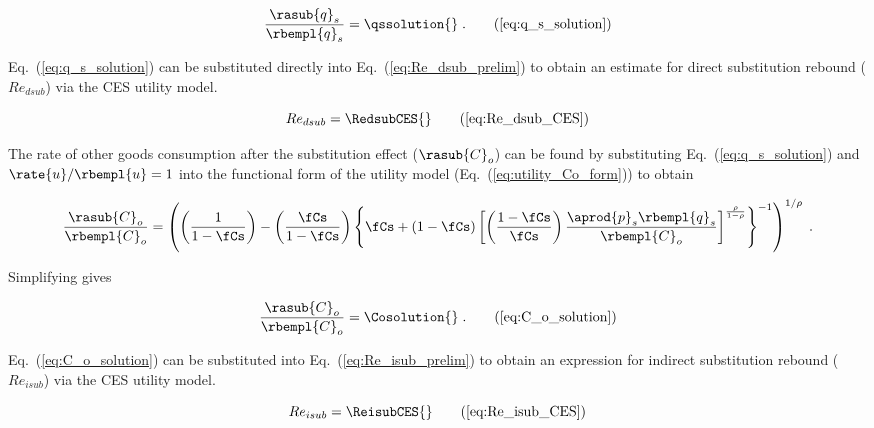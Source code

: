 \begin{equation}
  \frac{\rasub{q}_s}{\rbempl{q}_s} = \qssolution{} \; . \tag{\ref{eq:q_s_solution}}
\end{equation}

Eq.~(\ref{eq:q_s_solution}) can be substituted directly
into Eq.~(\ref{eq:Re_dsub_prelim})
to obtain an estimate for direct substitution rebound ($Re_{dsub}$)
via the CES utility model.

\begin{equation}
  Re_{dsub} = \RedsubCES{} \tag{\ref{eq:Re_dsub_CES}}
\end{equation}

The rate of other goods consumption after the substitution effect ($\rasub{C}_o$) 
can be found by substituting Eq.~(\ref{eq:q_s_solution}) and 
$\rate{u}/\rbempl{u} = 1$ 
into the functional form of the utility model (Eq.~(\ref{eq:utility_Co_form}))
to obtain

\begin{equation}
  \frac{\rasub{C}_o}{\rbempl{C}_o} = \left( \left( \frac{1}{1-\fCs} \right) 
                                     - \left( \frac{\fCs}{1-\fCs} \right)   
              \left\{ \fCs + (1-\fCs)
                  \left[ \left( \frac{1-\fCs}{\fCs} \right) \frac{\aprod{p}_s \rbempl{q}_s}{\rbempl{C}_o}   \right] 
                      ^{\frac{\rho}{1-\rho}} \right\} ^{-1} \right) ^{1/\rho} \; .
\end{equation}

Simplifying gives

\begin{equation}
  \frac{\rasub{C}_o}{\rbempl{C}_o} = \Cosolution{} \; . \tag{\ref{eq:C_o_solution}}
\end{equation}

Eq.~(\ref{eq:C_o_solution}) can be substituted into Eq.~(\ref{eq:Re_isub_prelim})
to obtain an expression for indirect substitution rebound ($Re_{isub}$)
via the CES utility model.

\begin{equation}
  Re_{isub} = \ReisubCES{} \tag{\ref{eq:Re_isub_CES}}
\end{equation}


\subsubsection{\Inceffect{}} 
\label{sec:Re_inc}

